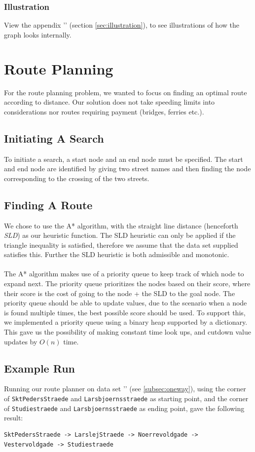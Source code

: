 \documentclass[11pt]{article}
\begin{document}
\subsubsection{Illustration}
View the appendix '' (section \autoref{sec:illustration}), to see illustrations of how the graph looks internally.

\section{Route Planning}
For the route planning problem, we wanted to focus on finding an optimal route according to distance. Our solution does not take speeding limits into considerations nor routes requiring payment (bridges, ferries etc.).

\subsection{Initiating A Search}
To initiate a search, a start node and an end node must be specified. The start and end node are identified by giving two street names and then finding the node corresponding to the crossing of the two streets.

\subsection{Finding A Route}
We chose to use the A* algorithm, with the straight line distance (henceforth \emph{SLD}) as our heuristic function. The SLD heuristic can only be applied if the triangle inequality is satisfied, therefore we assume that the data set supplied satisfies this. Further the SLD heuristic is both admissible and monotonic.\\
\\
The A* algorithm makes use of a priority queue to keep track of which node to expand next. The priority queue prioritizes the nodes based on their score, where their score is the cost of going to the node + the SLD to the goal node. The priority queue should be able to update values, due to the scenario when a node is found multiple times, the best possible score should be used. To support this, we implemented a priority queue using a binary heap supported by a dictionary. This gave us the possibility of making constant time look ups, and cutdown value updates by $O(n)$ time.

\subsection{Example Run}
Running our route planner on data set '' (see \ref{subsec:oneway}), using the corner of {\tt SktPedersStraede} and {\tt Larsbjoernsstraede} as starting point, and the corner of {\tt Studiestraede} and {\tt Larsbjoernsstraede} as ending point, gave the following result:
\begin{lstlisting}[style=logoutput]
SktPedersStraede -> LarslejStraede -> Noerrevoldgade ->
Vestervoldgade -> Studiestraede
\end{lstlisting}
\end{document}
